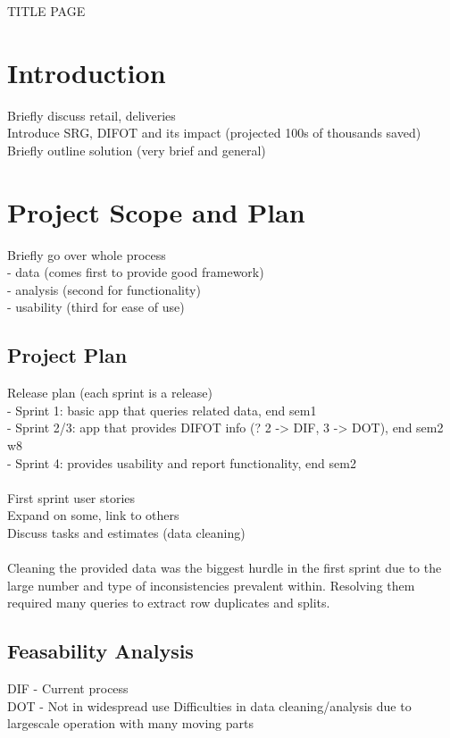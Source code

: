 \documentclass[paper=a4]{article}
\begin{document}
TITLE PAGE

\pagebreak

\tableofcontents

\pagebreak
\section{Introduction}
Briefly discuss retail, deliveries \\
Introduce SRG, DIFOT and its impact (projected 100s of thousands saved) \\
Briefly outline solution (very brief and general)
\section{Project Scope and Plan}
Briefly go over whole process \\
- data (comes first to provide good framework)\\
- analysis (second for functionality) \\
- usability (third for ease of use)

\subsection{Project Plan}
Release plan (each sprint is a release) \\
- Sprint 1: basic app that queries related data, end sem1 \\
- Sprint 2/3: app that provides DIFOT info (? 2 -> DIF, 3 -> DOT), end sem2 w8 \\
- Sprint 4: provides usability and report functionality, end sem2\\
\\
First sprint user stories \\
Expand on some, link to others \\
Discuss tasks and estimates (data cleaning)\\
\\
Cleaning the provided data was the biggest hurdle in the first sprint due to the large number and type of inconsistencies 
prevalent within. Resolving them required many queries to extract row duplicates and splits. 


\subsection{Feasability Analysis}
DIF - Current process \\
DOT - Not in widespread use
Difficulties in data cleaning/analysis due to largescale operation with many moving parts
\end{document}
